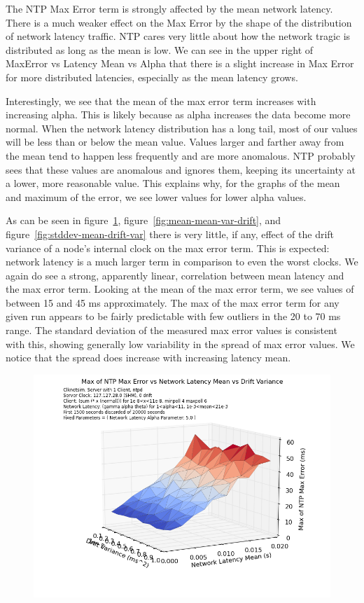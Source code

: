 The NTP Max Error term is strongly affected by the mean network
latency. There is a much weaker effect on the Max Error by the shape
of the distribution of network latency traffic. NTP cares very little
about how the network tragic is distributed as long as the mean is
low. We can see in the upper right of MaxError vs Latency Mean vs
Alpha that there is a slight increase in Max Error for more
distributed latencies, especially as the mean latency grows.

Interestingly, we see that the mean of the max error term increases
with increasing alpha. This is likely because as alpha increases the
data become more normal. When the network latency distribution has a
long tail, most of our values will be less than or below the mean
value. Values larger and farther away from the mean tend to happen
less frequently and are more anomalous. NTP probably sees that these
values are anomalous and ignores them, keeping its uncertainty at a
lower, more reasonable value. This explains why, for the graphs of the
mean and maximum of the error, we see lower values for lower alpha
values.

As can be seen in figure~\ref{fig:max-mean-var-drift},
figure~\ref{fig:mean-mean-var-drift}, and
figure~\ref{fig:stddev-mean-drift-var} there is very little, if any,
effect of the drift variance of a node's internal clock on the max
error term. This is expected: network latency is a much larger term in
comparison to even the worst clocks. We again do see a strong,
apparently linear, correlation between mean latency and the max error
term. Looking at the mean of the max error term, we see values of
between 15 and 45 ms approximately. The max of the max error term for
any given run appears to be fairly predictable with few outliers in
the 20 to 70 ms range. The standard deviation of the measured max
error values is consistent with this, showing generally low
variability in the spread of max error values. We notice that the
spread does increase with increasing latency mean.

\begin{figure}[t]
  \caption{}
  \label{fig:max-mean-var-drift}
  \includegraphics[width=0.8\linewidth]{max_max_err-mean_latency-drift_variance.png}
\end{figure}

